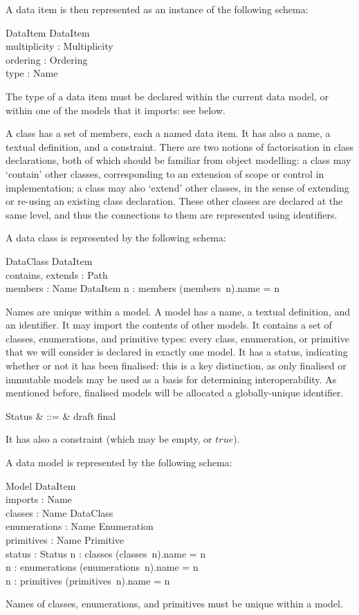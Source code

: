 \documentclass{article}
\begin{document}
		A data item is then represented as an instance of the following schema: 
		\begin{schema}{DataItem}
			DataItem \\
			multiplicity : Multiplicity \\
			ordering : Ordering \\
			type : Name
		\end{schema}
		The type of a data item must be declared within the current data model, or within one of the models that it imports: see below. 
		
		A class has a set of members, each a named data item.  It has also a name, a textual definition, and a constraint.  There are two notions of factorisation in class declarations, both of which should be familiar from object modelling: a class may `contain' other classes, corresponding to an extension of scope or control in implementation; a class may also `extend' other classes, in the sense of extending or re-using an existing class declaration.  These other classes are declared at the same level, and thus the connections to them are represented using identifiers.
		
		A data class is represented by the following schema:
		\begin{schema}{DataClass}
			DataItem \\
			contains, extends : \power Path \\
			members : Name \pfun DataItem
			\where
			\forall n : \dom members \spot (members~n).name = n 
		\end{schema}
		Names are unique within a model. A model has a name, a textual definition, and an identifier.  It may import the contents of other models.  It contains a set of classes, enumerations, and primitive types: every class, enumeration, or primitive that we will consider is declared in exactly one model.  It has a status, indicating whether or not it has been finalised: this is a key distinction, as only finalised or immutable models may be used as a basis for determining interoperability.  As mentioned before, finalised models will be allocated a globally-unique identifier.
		\begin{syntax}
			Status & ::= & draft \mid final 
		\end{syntax}
		It has also a constraint (which may be empty, or $true$). 
		
		A data model is represented by the following schema:
		\begin{schema}{Model}
			DataItem \\
			imports : \power Name \\
			classes : Name \pfun DataClass \\
			enumerations : Name \pfun Enumeration \\
			primitives : Name \pfun Primitive \\
			status : Status
			\where
			\forall n : \dom classes \spot (classes~n).name = n \\
			\forall n : \dom enumerations \spot (enumerations~n).name = n \\
			\forall n : \dom primitives \spot (primitives~n).name = n 
		\end{schema}
		Names of classes, enumerations, and primitives must be unique within a model.
		
\end{document}
